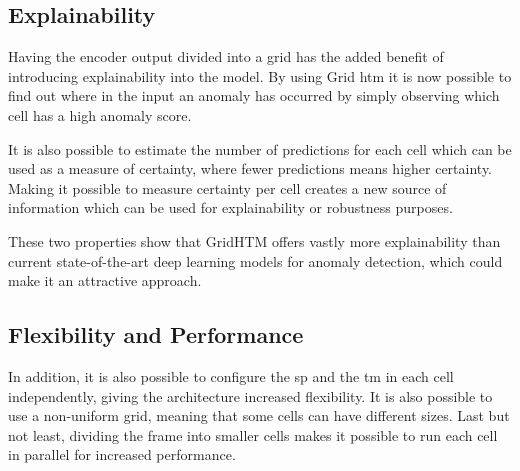 \subsection{Explainability}
Having the encoder output divided into a grid has the added benefit of introducing explainability into the model. By using Grid \gls*{htm} it is now possible to find out where in the input an anomaly has occurred by simply observing which cell has a high anomaly score.
\par
It is also possible to estimate the number of predictions for each cell which can be used as a measure of certainty, where fewer predictions means higher certainty. Making it possible to measure certainty per cell creates a new source of information which can be used for explainability or robustness purposes.
\par
These two properties show that GridHTM offers vastly more explainability than current state-of-the-art deep learning models for anomaly detection, which could make it an attractive approach.
\subsection{Flexibility and Performance}
In addition, it is also possible to configure the \gls*{sp} and the \gls*{tm} in each cell independently, giving the architecture increased flexibility. It is also possible to use a non-uniform grid, meaning that some cells can have different sizes. Last but not least, dividing the frame into smaller cells makes it possible to run each cell in parallel for increased performance.
